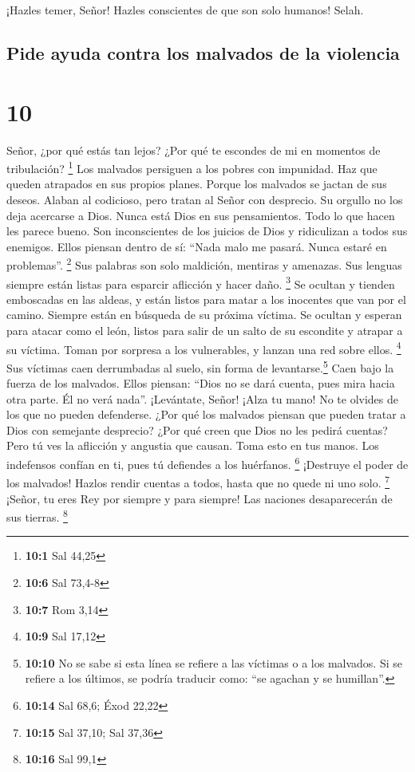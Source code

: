  ¡Hazles temer, Señor! Hazles conscientes de que son solo
humanos! Selah.

\hypertarget{pide-ayuda-contra-los-malvados-de-la-violencia}{%
\subsection{Pide ayuda contra los malvados de la
violencia}\label{pide-ayuda-contra-los-malvados-de-la-violencia}}

\hypertarget{section-9}{%
\section{10}\label{section-9}}

 Señor, ¿por qué estás tan lejos? ¿Por qué te escondes de
mi en momentos de tribulación? \footnote{\textbf{10:1} Sal 44,25}
 Los malvados persiguen a los pobres con impunidad. Haz
que queden atrapados en sus propios planes.  Porque los
malvados se jactan de sus deseos. Alaban al codicioso, pero tratan al
Señor con desprecio.  Su orgullo no los deja acercarse a
Dios. Nunca está Dios en sus pensamientos.  Todo lo que
hacen les parece bueno. Son inconscientes de los juicios de Dios y
ridiculizan a todos sus enemigos.  Ellos piensan dentro de
sí: ``Nada malo me pasará. Nunca estaré en problemas''. \footnote{\textbf{10:6}
  Sal 73,4-8}  Sus palabras son solo maldición, mentiras y
amenazas. Sus lenguas siempre están listas para esparcir aflicción y
hacer daño. \footnote{\textbf{10:7} Rom 3,14}  Se ocultan
y tienden emboscadas en las aldeas, y están listos para matar a los
inocentes que van por el camino. Siempre están en búsqueda de su próxima
víctima.  Se ocultan y esperan para atacar como el león,
listos para salir de un salto de su escondite y atrapar a su víctima.
Toman por sorpresa a los vulnerables, y lanzan una red sobre ellos.
\footnote{\textbf{10:9} Sal 17,12}  Sus víctimas caen
derrumbadas al suelo, sin forma de levantarse.\footnote{\textbf{10:10}
  No se sabe si esta línea se refiere a las víctimas o a los malvados.
  Si se refiere a los últimos, se podría traducir como: ``se agachan y
  se humillan''.} Caen bajo la fuerza de los malvados. 
Ellos piensan: ``Dios no se dará cuenta, pues mira hacia otra parte. Él
no verá nada''.  ¡Levántate, Señor! ¡Alza tu mano! No te
olvides de los que no pueden defenderse.  ¿Por qué los
malvados piensan que pueden tratar a Dios con semejante desprecio? ¿Por
qué creen que Dios no les pedirá cuentas?  Pero tú ves la
aflicción y angustia que causan. Toma esto en tus manos. Los indefensos
confían en ti, pues tú defiendes a los huérfanos. \footnote{\textbf{10:14}
  Sal 68,6; Éxod 22,22}  ¡Destruye el poder de los
malvados! Hazlos rendir cuentas a todos, hasta que no quede ni uno solo.
\footnote{\textbf{10:15} Sal 37,10; Sal 37,36}  ¡Señor,
tu eres Rey por siempre y para siempre! Las naciones desaparecerán de
sus tierras. \footnote{\textbf{10:16} Sal 99,1}

